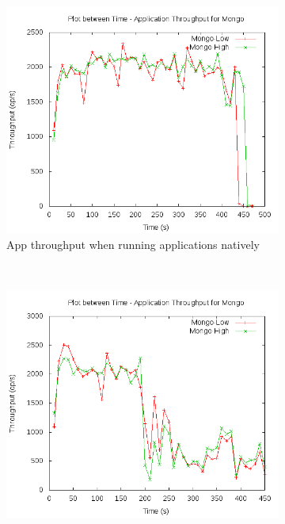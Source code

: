 	\begin{figure}[t!]
	  \centering
	  \begin{subfigure}[t]{0.48\textwidth}
	    \centering
	    \includegraphics[width=1\textwidth]{images/intro/native.png}
	    \caption{App throughput when running applications natively}
	    \label{plot_intro_native}
	  \end{subfigure}
	  ~ 
	  \begin{subfigure}[t]{0.48\textwidth}
	    \centering
	    \includegraphics[width=1\textwidth]{images/intro/observed.png}

\end{subfigure}
\end{figure}
